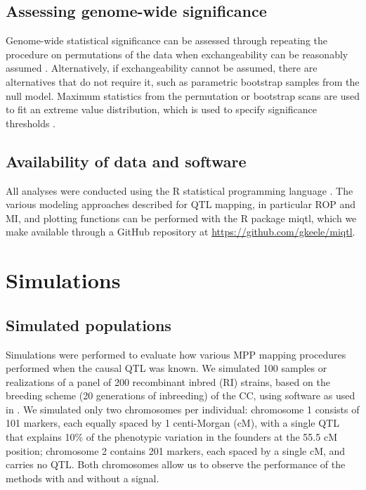 \subsection{Assessing genome-wide significance}

Genome-wide statistical significance can be assessed through repeating the procedure on permutations of the data when exchangeability can be reasonably assumed \citep{Doerge1996}. Alternatively, if exchangeability cannot be assumed, there are alternatives that do not require it, such as parametric bootstrap samples from the null model. Maximum statistics from the permutation or bootstrap scans are used to fit an extreme value distribution, which is used to specify significance thresholds \citep{Dudbridge2004,Valdar2006c}.

\subsection{Availability of data and software}

All analyses were conducted using the R statistical programming language \citep{RSoftware2018}. The various modeling approaches described for QTL mapping, in particular ROP and MI, and plotting functions can be performed with the R package miqtl, which we make available through a GitHub repository at \url{https://github.com/gkeele/miqtl}.

\section{Simulations}
\subsection{Simulated populations}

Simulations were performed to evaluate how various MPP mapping procedures performed when the causal QTL was known. We simulated 100 samples or realizations of a panel of 200 recombinant inbred (RI) strains, based on the breeding scheme (20 generations of inbreeding) of the CC, using software as used in \cite{Valdar2006c}. We simulated only two chromosomes per individual: chromosome 1 consists of 101 markers, each equally spaced by 1 centi-Morgan (cM), with a single QTL that explains 10\% of the phenotypic variation in the founders at the 55.5 cM position; chromosome 2 contains 201 markers, each spaced by a single cM, and carries no QTL. Both chromosomes allow us to observe the performance of the methods with and without a signal.


